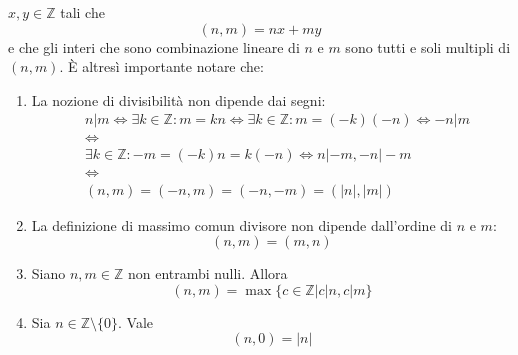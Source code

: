 \documentclass[oneside]{book}
\theoremstyle{remark}
\begin{document}
$x,y\in\mathbb{Z}$ tali che \[ (n,m) = nx + my \]
e che gli interi che sono combinazione lineare di $n$ e $m$ sono       
tutti e soli multipli di $(n,m)$. È altresì importante notare che:
\begin{enumerate}
\item La nozione di divisibilità non dipende dai segni:
\begin{align*}
    &n|m \Longleftrightarrow \exists k\in\mathbb{Z}:m=kn \Longleftrightarrow \exists k\in\mathbb{Z}:m=(-k)(-n) \Longleftrightarrow -n|m\\
    &\Longleftrightarrow\\
    &\exists k\in\mathbb{Z}:-m=(-k)n=k(-n) \Longleftrightarrow n|-m,-n|-m\\
    &\Longleftrightarrow\\
    &(n,m) = (-n,m) = (-n,-m) = (|n|,|m|)
\end{align*}
\item La definizione di massimo comun divisore non dipende dall'ordine
di $n$ e $m$: \[ (n,m)=(m,n) \]
\item Siano $n,m\in\mathbb{Z}$ non entrambi nulli. Allora
\[ (n,m)=\max\{c\in\mathbb{Z}| c|n,c|m\} \]
\item Sia $n\in\mathbb{Z}\setminus\{0\}$. Vale \[ (n,0)=|n| \]
\end{enumerate}
\end{document}
